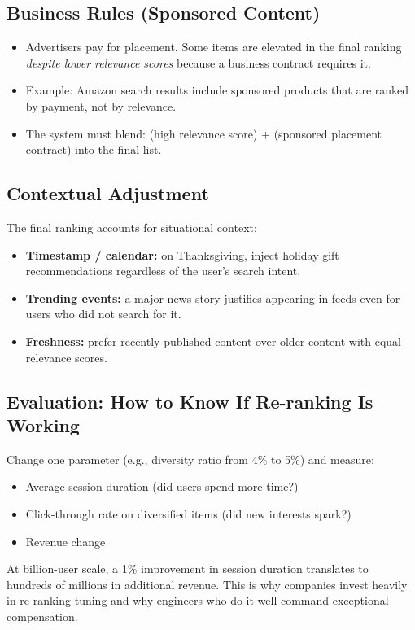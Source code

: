 \documentclass[11pt]{article}
\begin{document}
\subsection{Business Rules (Sponsored Content)}
\begin{itemize}
    \item Advertisers pay for placement. Some items are elevated in the
      final ranking \emph{despite lower relevance scores} because a
      business contract requires it.
    \item Example: Amazon search results include sponsored products that
      are ranked by payment, not by relevance.
    \item The system must blend: (high relevance score) + (sponsored
      placement contract) into the final list.
\end{itemize}

\subsection{Contextual Adjustment}
The final ranking accounts for situational context:
\begin{itemize}
    \item \textbf{Timestamp / calendar:} on Thanksgiving, inject holiday
      gift recommendations regardless of the user's search intent.
    \item \textbf{Trending events:} a major news story justifies appearing
      in feeds even for users who did not search for it.
    \item \textbf{Freshness:} prefer recently published content over older
      content with equal relevance scores.
\end{itemize}

\subsection{Evaluation: How to Know If Re-ranking Is Working}
Change one parameter (e.g., diversity ratio from 4\% to 5\%) and measure:
\begin{itemize}
    \item Average session duration (did users spend more time?)
    \item Click-through rate on diversified items (did new interests spark?)
    \item Revenue change
\end{itemize}
At billion-user scale, a 1\% improvement in session duration translates
to hundreds of millions in additional revenue. This is why companies
invest heavily in re-ranking tuning and why engineers who do it well
command exceptional compensation.
\end{document}
